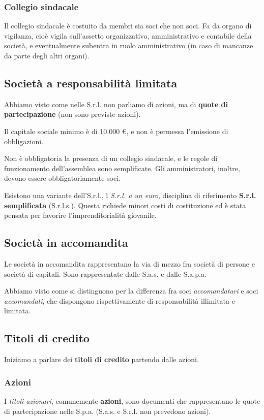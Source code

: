 \documentclass[a4paper,11pt]{article}
\begin{document}
\subsubsection{Collegio sindacale}
Il collegio sindacale è costuito da membri sia soci che non soci.
Fa da organo di vigilanza, cioè vigila sull'assetto organizzativo, amministrativo e contabile della società, e eventualmente subentra in ruolo amministrativo (in caso di mancanze da parte degli altri organi). 

\subsection{Società a responsabilità limitata}
Abbiamo visto come nelle S.r.l. non parliamo di azioni, ma di \textbf{quote di partecipazione} (non sono previste azioni).

Il capitale sociale minimo è di 10.000 €, e non è permessa l'emissione di obbligazioni.

Non è obbligatoria la presenza di un collegio sindacale, e le regole di funzionamento dell'assemblea sono semplificate.
Gli amministratori, inoltre, devono essere obbligatoriamente soci.

Esistono una variante dell'S.r.l., l \textit{S.r.l. a un euro}, disciplina di riferimento \textbf{S.r.l. semplificata} (S.r.l.s.).
Questa richiede minori costi di costituzione ed è stata pensata per favorire l'imprenditorialità giovanile.

\subsection{Società in accomandita}
Le società in accomandita rappresentano la via di mezzo fra società di persone e società di capitali.
Sono rappresentate dalle S.a.s. e dalle S.a.p.a.

Abbiamo visto come si distinguono per la differenza fra soci \textit{accomandatari} e soci \textit{accomandati}, che dispongono rispettivamente di responsabilità illimitata e limitata.

\subsection{Titoli di credito}
Iniziamo a parlare dei \textbf{titoli di credito} partendo dalle azioni.

\subsubsection{Azioni}
I \textit{titoli azionari}, comunemente \textbf{azioni}, sono documenti che rappresentano le quote di partecipazione nelle S.p.a. (S.a.s. e S.r.l. non prevedono azioni).
\end{document}
